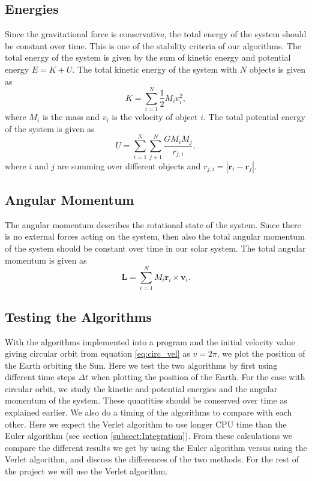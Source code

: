 \documentclass[12pt,a4paper,english]{article}
\begin{document}
\subsection{Energies}
\label{subsect:Energies}
Since the gravitational force is conservative, the total energy of the system should be constant over time. This is one of the stability criteria of our algorithms. The total energy of the system is given by the sum of kinetic energy and potential energy $E=K+U$. The total kinetic energy of the system with $N$ objects is given as
\begin{equation}
\label{eq:K}
K=\sum_{i=1}^{N}\frac{1}{2}M_iv_i^2,
\end{equation}
where $M_i$ is the mass and $v_i$ is the velocity of object $i$. The total potential energy of the system is given as 
\begin{equation}
\label{eq:U}
U=\sum_{i=1}^{N}\sum_{j+1}^{N}\frac{GM_iM_j}{r_{j,i}},
\end{equation}
where $i$ and $j$ are summing over different objects and $r_{j,i}=|\textbf{r}_i-\textbf{r}_j|$.

\subsection{Angular Momentum}
\label{subsect:Ang_mom}
The angular momentum describes the rotational state of the system. Since there is no external forces acting on the system, then also the total angular momentum of the system should be constant over time in our solar system. The total angular momentum is given as
\begin{equation}
\label{eq:ang_mom}
\textbf{L}=\sum_{i=1}^{N}M_i\textbf{r}_i\times \textbf{v}_i.
\end{equation}

\subsection{Testing the Algorithms}
\label{subsect:Testing}
With the algorithms implemented into a program and the initial velocity value giving circular orbit from equation \ref{eq:circ_vel} as $v=2\pi$, we plot the position of the Earth orbiting the Sun. Here we test the two algorithms by first using different time steps $\Delta t$ when plotting the position of the Earth. For the case with circular orbit, we study the kinetic and potential energies and the angular momentum of the system. These quantities should be conserved over time as explained earlier. We also do a timing of the algorithms to compare with each other. Here we expect the Verlet algorithm to use longer CPU time than the Euler algorithm (see section \ref{subsect:Integration}). From these calculations we compare the different results we get by using the Euler algorithm versus using the Verlet algorithm, and discuss the differences of the two methods. For the rest of the project we will use the Verlet algorithm.
\end{document}
